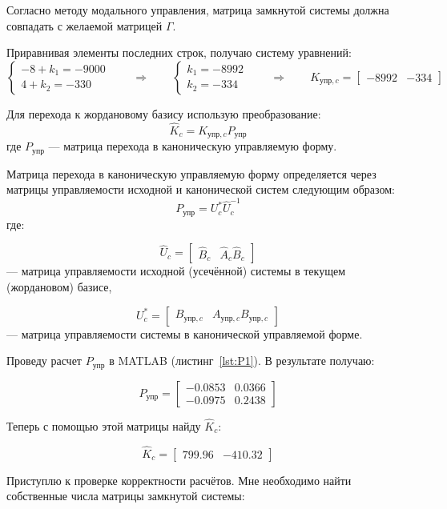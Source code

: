 \documentclass[a4paper,12pt]{article}
\begin{document}
Согласно методу модального управления, матрица замкнутой системы должна совпадать с желаемой матрицей \(\Gamma\).

Приравнивая элементы последних строк, получаю систему уравнений:
\[
\begin{cases}
	-8 + k_1 = -9000 \\
	4 + k_2 = -330
\end{cases}
\qquad \Longrightarrow \qquad
\begin{cases}
	k_1 = -8992 \\
	k_2 = -334
\end{cases}
\qquad \Longrightarrow \qquad
K_{\text{упр},c} =
\begin{bmatrix}
	-8992 & -334
\end{bmatrix}
\]

Для перехода к жордановому базису использую преобразование:
\[
\hat K_c = K_{\text{упр},c} P_{\text{упр}}
\]
где \(P_{\text{упр}}\) --- матрица перехода в каноническую управляемую форму.

Матрица перехода в каноническую управляемую форму определяется через
матрицы управляемости исходной и канонической систем следующим образом:
\[
P_{\text{упр}} = U_c^* \hat U_c^{-1}
\]
где:

\[
\hat U_c =
\begin{bmatrix}
	\hat B_c & \hat A_c \hat B_c
\end{bmatrix}
\]
--- матрица управляемости исходной (усечённой) системы в текущем (жордановом) базисе,

\[
U_c^* =
\begin{bmatrix}
	B_{\text{упр},c} & A_{\text{упр},c} B_{\text{упр},c}
\end{bmatrix}
\]
--- матрица управляемости системы в канонической управляемой форме.

Проведу расчет \(P_{\text{упр}}\) в MATLAB (листинг~\ref{lst:P1}). В результате получаю:

\[
P_{\text{упр}} =
\begin{bmatrix}
	-0.0853 & 0.0366 \\
	-0.0975 & 0.2438
\end{bmatrix}
\]

Теперь с помощью этой матрицы найду \(\hat K_c\):

\[
\hat K_c =
\begin{bmatrix}
	799.96 & -410.32
\end{bmatrix}
\]

Приступлю к проверке корректности расчётов. Мне необходимо найти собственные числа матрицы замкнутой системы:
\end{document}
